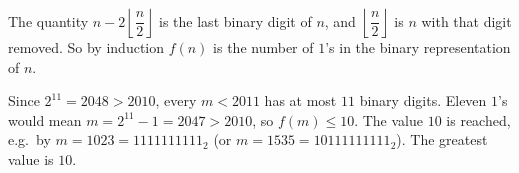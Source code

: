 The quantity $n-2\left\lfloor\dfrac {n}{2}\right\rfloor$ is the last binary digit of $n$, and $\left\lfloor\dfrac {n}{2}\right\rfloor$ is $n$ with that digit removed. So by induction $f(n)$ is the number of $1$'s in the binary representation of $n$.

Since $2^{11}=2048>2010$, every $m<2011$ has at most $11$ binary digits. Eleven $1$'s would mean $m=2^{11}-1=2047>2010$, so $f(m)\le10$. The value $10$ is reached, e.g.\ by $m=1023=1111111111_2$ (or $m=1535=10111111111_2$). The greatest value is $\boxed{10}$.
